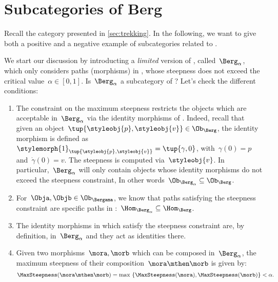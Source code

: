 
\section{Subcategories of Berg}
\label{sec:subcat_berg}

Recall the category \Berg presented in \cref{sec:trekking}.
In the following, we want to give both a positive and a negative example of subcategories related to \Berg.

We start our discussion by introducting a \emph{limited} version of \Berg, called~$\Berg_\alpha$, which only considers paths (morphisms) in \Berg, whose steepness does not exceed the critical value~$\alpha\in [0,1]$.
Is~$\Berg_\alpha$ a subcategory of \Berg?
Let's check the different conditions:
\begin{enumerate}
	\item The constraint on the maximum steepness restricts the objects which are acceptable in~$\Berg_\alpha$ via the identity morphisms of \Berg.
	      Indeed, recall that given an object~$\tup{\styleobj{p},\styleobj{v}}\in \Ob_{\Berg}$, the identity morphism is defined as~$\stylemorph{1}_{\tup{\styleobj{p},\styleobj{v}}}=\tup{\gamma,0}$, with~$\gamma(0)=p$ and~$\dot{\gamma}(0)=v$.
	      The steepness is computed via~$\styleobj{v}$.
	      In particular,~$\Berg_\alpha$ will only contain objects whose identity morphisms do not exceed the steepness constraint, In other words~$\Ob_{\Berg_\alpha} \subseteq \Ob_\Berg$.
	\item For~$\Obja,\Objb\in \Ob_{\Bergama}$, we know that paths satisfying the steepness constraint are specific paths in \Berg:~$\Hom_{\Berg_\alpha}\subseteq \Hom_{\Berg}$.
	\item The identity morphisms in \Berg which satisfy the steepness constraint are, by definition, in~$\Berg_\alpha$ and they act as identities there.
	\item Given two morphisms~$\mora,\morb$ which can be composed in~$\Berg_\alpha$, the maximum steepness of their composition~$\mora \mthen \morb$ is given by:
	      \begin{equation*}
		      \MaxSteepness(\mora \mthen \morb)
		      =
		      \max \ \{
		      \MaxSteepness(\mora),
		      \MaxSteepness(\morb)
		      \}
		      <
		      \alpha.
	      \end{equation*}
\end{enumerate}

